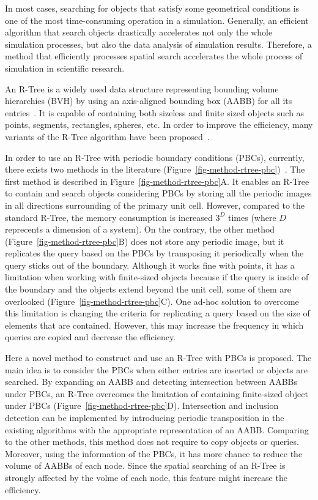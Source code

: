 \documentclass[10pt,letterpaper,twocolumn]{article}
\begin{document}
In most cases, searching for objects that satisfy some geometrical conditions
is one of the most time-consuming operation in a simulation. Generally, an
efficient algorithm that search objects drastically accelerates not only
the whole simulation processes, but also the data analysis of simulation results.
Therefore, a method that efficiently processes spatial search accelerates the
whole process of simulation in scientific research.

An R-Tree is a widely used data structure representing bounding volume
hierarchies (BVH) by using an axis-aligned bounding box (AABB) for all its
entries~\cite{Guttman1984}.
It is capable of containing both sizeless and finite sized objects such as
points, segments, rectangles, spheres, etc.
In order to improve the efficiency, many variants of the R-Tree algorithm have
been proposed~\cite{Greene1989, Beckmann1990, Leuteneggert1997, Mitsuhashi2016}.

In order to use an R-Tree with periodic boundary conditions (PBCs), currently,
there exists two methods in the literature
(Figure~\ref{fig-method-rtree-pbc})~\cite{Mitsuhashi2016}.
The first method is described in Figure~\ref{fig-method-rtree-pbc}A.
It enables an R-Tree to contain and search objects considering PBCs
by storing all the periodic images in all directions surrounding of the primary
unit cell.
However, compared to the standard R-Tree, the memory consumption is increased
$3^D$ times (where $D$ reprecents a dimension of a system).
On the contrary, the other method (Figure~\ref{fig-method-rtree-pbc}B)
does not store any periodic image, but it replicates the query based on the
PBCs by transposing it periodically when the query sticks out of the boundary.
Although it works fine with points, it has a limitation when working with
finite-sized objects because if the query is inside of the boundary and the
objects extend beyond the unit cell, some of them are overlooked
(Figure~\ref{fig-method-rtree-pbc}C).
One ad-hoc solution to overcome this limitation is changing the criteria for
replicating a query based on the size of elements that are contained.
However,  this may increase the frequency in which queries are copied and
decrease the efficiency.

Here a novel method to construct and use an R-Tree with PBCs is proposed.
The main idea is to consider the PBCs when either entries are inserted or
objects are searched.
By expanding an AABB and detecting intersection between AABBs under PBCs,
an R-Tree overcomes the limitation of containing finite-sized object under PBCs
(Figure~\ref{fig-method-rtree-pbc}D). Intersection and inclusion detection can be
implemented by introducing periodic transposition in the existing algorithms
with the appropriate representation of an AABB.
Comparing to the other methods, this method does not require to copy objects or queries.
Moreover, using the information of the PBCs, it has more chance
to reduce the volume of AABBs of each node. Since the spatial
searching of an R-Tree is strongly affected by the volme of each node,
this feature might increase the efficiency.
\end{document}
